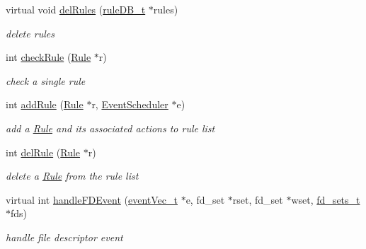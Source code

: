 \begin{DoxyCompactItemize}
\mbox{\label{classQOSProcessor_ab873474a8a86af31723c1a9c7bcd6efb}} 
virtual void \hyperlink{classQOSProcessor_ab873474a8a86af31723c1a9c7bcd6efb}{del\+Rules} (\hyperlink{RuleFileParser_8h_a7d5bb94bb17a8a1d92db2a89a0cc96d1}{rule\+D\+B\+\_\+t} $\ast$rules)
\begin{DoxyCompactList}\small\item\em delete rules \end{DoxyCompactList}\item 
\mbox{\label{classQOSProcessor_ab929839bf92971682861fb8784f177c9}} 
int \hyperlink{classQOSProcessor_ab929839bf92971682861fb8784f177c9}{check\+Rule} (\hyperlink{classRule}{Rule} $\ast$r)
\begin{DoxyCompactList}\small\item\em check a single rule \end{DoxyCompactList}\item 
int \hyperlink{classQOSProcessor_a6378d7fdd049553ad9a449d5c206c865}{add\+Rule} (\hyperlink{classRule}{Rule} $\ast$r, \hyperlink{classEventScheduler}{Event\+Scheduler} $\ast$e)
\begin{DoxyCompactList}\small\item\em add a \hyperlink{classRule}{Rule} and its associated actions to rule list \end{DoxyCompactList}\item 
int \hyperlink{classQOSProcessor_a4b287dd7fd9b024b841649a929fe80de}{del\+Rule} (\hyperlink{classRule}{Rule} $\ast$r)
\begin{DoxyCompactList}\small\item\em delete a \hyperlink{classRule}{Rule} from the rule list \end{DoxyCompactList}\item 
\mbox{\label{classQOSProcessor_a96048b3439c2200ed3766cd009c41ed5}} 
virtual int \hyperlink{classQOSProcessor_a96048b3439c2200ed3766cd009c41ed5}{handle\+F\+D\+Event} (\hyperlink{QualityManagerComponent_8h_acd67c59a21d5c694ab882c8905db0a2a}{event\+Vec\+\_\+t} $\ast$e, fd\+\_\+set $\ast$rset, fd\+\_\+set $\ast$wset, \hyperlink{structfd__sets__t}{fd\+\_\+sets\+\_\+t} $\ast$fds)
\begin{DoxyCompactList}\small\item\em handle file descriptor event \end{DoxyCompactList}\item 

\end{DoxyCompactItemize}
